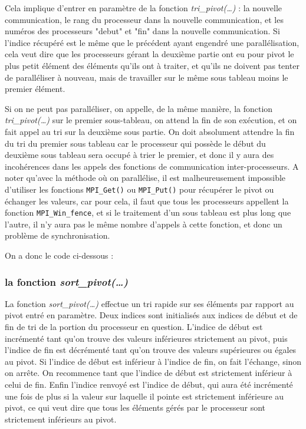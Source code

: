 \cleardoublepage
Cela implique d'entrer en paramètre de la fonction \textit{tri\_pivot(\dots)} : la nouvelle communication, le rang du processeur dans la nouvelle communication, et les numéros des processeurs "debut" et "fin" dans la nouvelle communication.
Si l'indice récupéré est le même que le précédent ayant engendré une parallélisation, cela veut dire que les processeurs gérant la deuxième partie ont eu pour pivot le plus petit élément des éléments qu'ils ont à traiter, et qu'ils ne doivent pas tenter de paralléliser à nouveau, mais de travailler sur le même sous tableau moins le premier élément.



Si on ne peut pas paralléliser, on appelle, de la même manière, la fonction \textit{tri\_pivot(\dots)} sur le premier sous-tableau, on attend la fin de son exécution, et on fait appel au tri sur la deuxième sous partie. On doit absolument attendre la fin du tri du premier sous tableau car le processeur qui possède le début du deuxième sous tableau sera occupé à trier le premier, et donc il y aura des incohérences dans les appels des fonctions de communication inter-processeurs.
A noter qu'avec la méthode où on parallélise, il est malheureusement impossible d'utiliser les fonctions \verb+MPI_Get()+ ou \verb+MPI_Put()+ pour récupérer le pivot ou échanger les valeurs, car pour cela, il faut que tous les processeurs appellent la fonction \verb+MPI_Win_fence+, et si le traitement d'un sous tableau est plus long que l'autre, il n'y aura pas le même nombre d'appels à cette fonction, et donc un problème de synchronisation.



On a donc le code ci-dessous :


\subsubsection*{la fonction \textit{sort\_pivot(\dots)}}
La fonction \textit{sort\_pivot(\dots)} effectue un tri rapide sur ses éléments par rapport au pivot entré en paramètre. Deux indices sont initialisés aux indices de début et de fin de tri de la portion du processeur en question. L'indice de début est incrémenté tant qu'on trouve des valeurs inférieures strictement au pivot, puis l'indice de fin est décrémenté tant qu'on trouve des valeurs supérieures ou égales au pivot. Si l'indice de début est inférieur à l'indice de fin, on fait l'échange, sinon on arrête. On recommence tant que l'indice de début est strictement inférieur à celui de fin.
Enfin l'indice renvoyé est l'indice de début, qui aura été incrémenté une fois de plus si la valeur sur laquelle il pointe est strictement inférieure au pivot, ce qui veut dire que tous les éléments gérés par le processeur sont strictement inférieurs au pivot.

